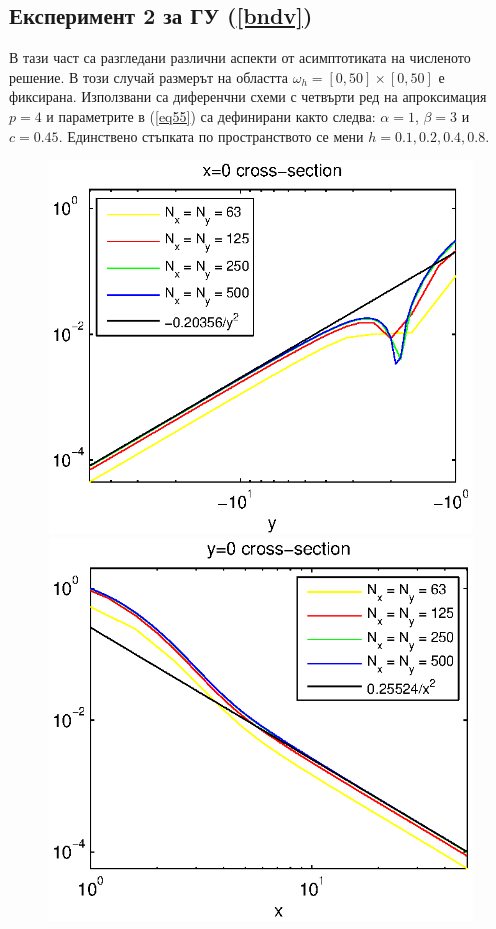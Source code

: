 \documentclass{article}
\newcommand{\rf}[1]{(\ref{#1})}
\begin{document}
\subsection{Експеримент 2 за ГУ \rf{bndv}}
В тази част са разгледани различни аспекти от асимптотиката на численото решение. В този случай размерът на областта $\omega_h = [0, 50] \times [0, 50]$ е фиксирана. Използвани са диференчни схеми с четвърти ред на апроксимация $p=4$ и параметрите в \rf{eq55} са дефинирани както следва: $\alpha = 1$, $\beta = 3$ и $c=0.45$. Единствено стъпката по пространството се мени $h=0.1, 0.2, 0.4, 0.8$.
\begin{figure}[ht]
	\begin{minipage}[b]{0.5\linewidth}
		\raggedleft
		\includegraphics[width=\linewidth]{NewBoundaryCondition/crossSectionLogX=0.eps}
	\end{minipage}	
	\begin{minipage}[b]{0.5\linewidth}
		\raggedright
		 \includegraphics[width=\linewidth]{NewBoundaryCondition/crossSectionLogY=0.eps}

\end{minipage}
\end{figure}
\end{document}
